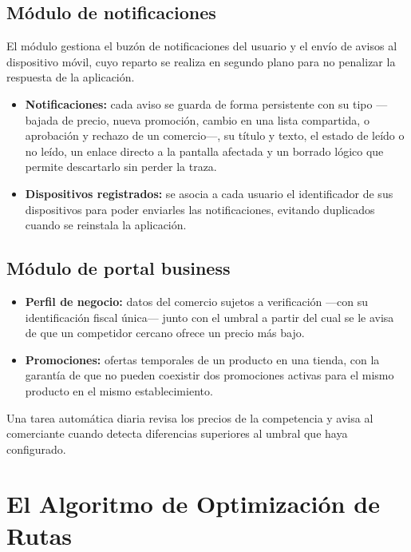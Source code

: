 \subsection{M\'odulo de notificaciones}\label{subsec:impl-notificaciones}

El m\'odulo gestiona el buz\'on de notificaciones del usuario y el env\'io de avisos al dispositivo
m\'ovil, cuyo reparto se realiza en segundo plano para no penalizar la respuesta de la aplicaci\'on.

\begin{itemize}
  \item \textbf{Notificaciones:} cada aviso se guarda de forma persistente con su tipo ---bajada de
    precio, nueva promoci\'on, cambio en una lista compartida, o aprobaci\'on y rechazo de un
    comercio---, su t\'itulo y texto, el estado de le\'ido o no le\'ido, un enlace directo a la
    pantalla afectada y un borrado l\'ogico que permite descartarlo sin perder la traza.
  \item \textbf{Dispositivos registrados:} se asocia a cada usuario el identificador de sus
    dispositivos para poder enviarles las notificaciones, evitando duplicados cuando se reinstala
    la aplicaci\'on.
\end{itemize}

\subsection{M\'odulo de portal business}\label{subsec:impl-business}

\begin{itemize}
  \item \textbf{Perfil de negocio:} datos del comercio sujetos a verificaci\'on ---con su
    identificaci\'on fiscal \'unica--- junto con el umbral a partir del cual se le avisa de que un
    competidor cercano ofrece un precio m\'as bajo.
  \item \textbf{Promociones:} ofertas temporales de un producto en una tienda, con la garant\'ia de
    que no pueden coexistir dos promociones activas para el mismo producto en el mismo
    establecimiento.
\end{itemize}

Una tarea autom\'atica diaria revisa los precios de la competencia y avisa al comerciante cuando
detecta diferencias superiores al umbral que haya configurado.

\section{El Algoritmo de Optimizaci\'on de Rutas}\label{sec:algoritmo}


